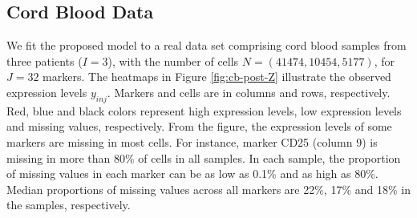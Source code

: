 \documentclass[12pt,]{article}
\begin{document}
\subsection{Cord Blood Data}\label{sec:CB-real}
We fit the proposed model to a real data set comprising cord blood samples from
three patients ($I=3$), with the number of cells $N=(41474, 10454, 5177)$, for
$J=32$ markers. The heatmaps in Figure \ref{fig:cb-post-Z} illustrate the
observed expression levels $y_{inj}$.  Markers and cells are in columns and
rows, respectively. 
% 
%
Red, blue and black colors represent high expression levels, low expression
levels and missing values, respectively.  From the figure, the expression
levels of some markers are missing in most cells. For instance, marker CD25
(column 9) is missing in more than 80\% of cells in all samples.
In each sample, the proportion of missing values in each marker can be as low
as 0.1\% and as high as 80\%.  Median proportions of missing values across all
markers are 22\%, 17\% and 18\% in the samples, respectively.
\end{document}
